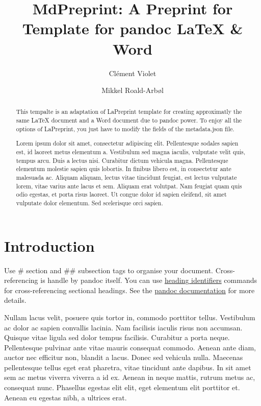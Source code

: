 \documentclass[9pt,biorxiv,doublespacing,lineno]{lapreprint}
\title{MdPreprint: A Preprint for Template for pandoc LaTeX \& Word}
\author[ \orcidlink{0000-0001-6217-5891} 1\Letter]{Clément Violet}
\author[ \orcidlink{0000-0002-9998-0058} 2]{Mikkel Roald-Arbøl}
\affil[1]{IFREMER, Centre de Bretagne, DYNECO LEBCO, Plouzané, France}
\affil[2]{School of Life Sciences, Univeristy of Sussex, Brighton and
Hove, Great Britain}
\begin{document}
\maketitle

\begin{abstract}

This tempalte is an adaptation of LaPreprint template for creating
approximatly the same LaTeX document and a Word document due to pandoc
power. To enjoy all the options of LaPreprint, you just have to modify
the fields of the metadata.json file.

Lorem ipsum dolor sit amet, consectetur adipiscing elit. Pellentesque
sodales sapien est, id laoreet metus elementum a. Vestibulum sed magna
iaculis, vulputate velit quis, tempus arcu. Duis a lectus nisi.
Curabitur dictum vehicula magna. Pellentesque elementum molestie sapien
quis lobortis. In finibus libero est, in consectetur ante malesuada ac.
Aliquam aliquam, lectus vitae tincidunt feugiat, est lectus vulputate
lorem, vitae varius ante lacus et sem. Aliquam erat volutpat. Nam
feugiat quam quis odio egestas, et porta risus laoreet. Ut congue dolor
id sapien eleifend, sit amet vulputate dolor elementum. Sed scelerisque
orci sapien.
\end{abstract}

\hypertarget{introduction}{%
\section{Introduction}\label{introduction}}

Use \# section and \#\# subsection tags to organise your document.
Cross-referencing is handle by pandoc itself. You can use
\protect\hyperlink{introduction}{heading identifiers} commands for
cross-referencing sectional headings. See the
\href{https://pandoc.org/MANUAL.html\#extension-auto_identifiers}{pandoc
documentation} for more details.

Nullam lacus velit, posuere quis tortor in, commodo porttitor tellus.
Vestibulum ac dolor ac sapien convallis lacinia. Nam facilisis iaculis
risus non accumsan. Quisque vitae ligula sed dolor tempus facilisis.
Curabitur a porta neque. Pellentesque pulvinar ante vitae mauris
consequat commodo. Aenean ante diam, auctor nec efficitur non, blandit a
lacus. Donec sed vehicula nulla. Maecenas pellentesque tellus eget erat
pharetra, vitae tincidunt ante dapibus. In sit amet sem ac metus viverra
viverra a id ex. Aenean in neque mattis, rutrum metus ac, consequat
nunc. Phasellus egestas elit elit, eget elementum elit porttitor et.
Aenean eu egestas nibh, a ultrices erat.
\end{document}

